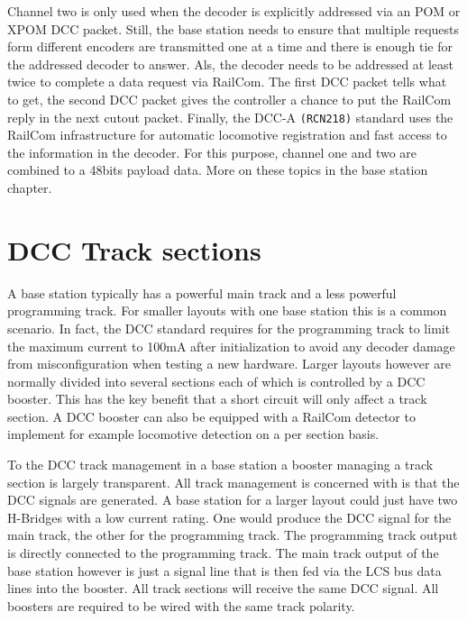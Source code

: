 Channel two is only used when the decoder is explicitly addressed via an POM or XPOM DCC packet. Still, the base station needs to ensure that multiple requests form different encoders are transmitted one at a time and there is enough tie for the addressed decoder to answer. Als, the decoder needs to be addressed at least twice to complete a data request via RailCom. The first DCC packet tells what to get, the second DCC packet gives the controller a chance to put the RailCom reply in the next cutout packet. Finally, the DCC-A \texttt{(RCN218)} standard uses the RailCom infrastructure for automatic locomotive registration and fast access to the information in the decoder. For this purpose, channel one and two are combined to a 48bits payload data. More on these topics in the base station chapter.

\section{DCC Track sections}

A base station typically has a powerful main track and a less powerful programming track. For smaller layouts with one base station this is a common scenario. In fact, the DCC standard requires for the programming track to limit the maximum current to 100mA after initialization to avoid any decoder damage from misconfiguration when testing a new hardware. Larger layouts however are normally divided into several sections each of which is controlled by a DCC booster. This has the key benefit that a short circuit will only affect a track section. A DCC booster can also be equipped with a RailCom detector to implement for example locomotive detection on a per section basis.

To the DCC track management in a base station a booster managing a track section is largely transparent. All track management is concerned with is that the DCC signals are generated. A base station for a larger layout could just have two H-Bridges with a low current rating. One would produce the DCC signal for the main track, the other for the programming track. The programming track output is directly connected to the programming track. The main track output of the base station however is just a signal line that is then fed via the LCS bus data lines into the booster. All track sections will receive the same DCC signal. All boosters are required to be wired with the same track polarity.

